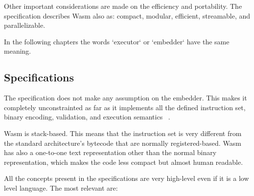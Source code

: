 \documentclass[../main.tex]{subfiles}
\begin{document}
Other important considerations are made on the efficiency and portability. The specification describes Wasm also as: compact, modular, efficient, streamable, and parallelizable.


In the following chapters the words `executor` or `embedder` have the same meaning.

\subsection{Specifications}

The specification does not make any assumption on the embedder. This makes it completely unconstrainted as far as it implements all the defined instruction set, binary encoding, validation, and execution semantics ~\cite{wasm-core-spec}.

Wasm is stack-based. This means that the instruction set is very different from the standard architecture's bytecode that are normally registered-based. Wasm has also a one-to-one text representation other than the normal binary representation, which makes the code less compact but almost human readable.

All the concepts present in the specifications are very high-level even if it is a low level language. The most relevant are:
\end{document}
